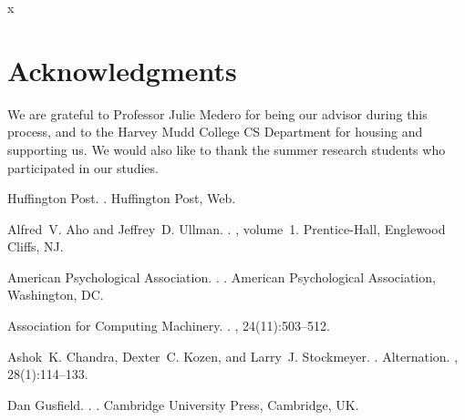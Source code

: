 \documentclass[11pt,letterpaper]{article}
\begin{document}
	x
	
	\section*{Acknowledgments}
	
	We are grateful to Professor Julie Medero for being our advisor during this process, and to the Harvey Mudd College CS Department for housing and supporting us. We would also like to thank the summer research students who participated in our studies.
	
	\begin{thebibliography}{}
		
		{Huffington Post}.
		.
		\newblock Huffington Post, Web.
		
		Alfred~V. Aho and Jeffrey~D. Ullman.
		.
		, volume~1.
		\newblock Prentice-{Hall}, Englewood Cliffs, NJ.
		
		{American Psychological Association}.
		.
		.
		\newblock American Psychological Association, Washington, DC.
		
		{Association for Computing Machinery}.
		.
		, 24(11):503--512.
		
		Ashok~K. Chandra, Dexter~C. Kozen, and Larry~J. Stockmeyer.
		.
		\newblock Alternation.
		,
		28(1):114--133.
		
		Dan Gusfield.
		.
		.
		\newblock Cambridge University Press, Cambridge, UK.
		
	\end{thebibliography}
	
\end{document}
